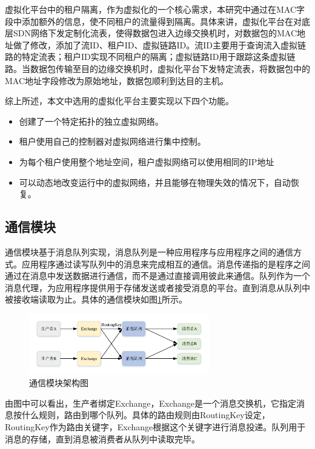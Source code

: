 虚拟化平台中的租户隔离，作为虚拟化的一个核心需求，本研究中通过在MAC字段中添加额外的信息，使不同租户的流量得到隔离。具体来讲，虚拟化平台在对底层SDN网络下发定制化流表，使得数据包进入边缘交换机时，对数据包的MAC地址做了修改，添加了流ID、租户ID、虚拟链路ID。流ID主要用于查询流入虚拟链路的特定流表；租户ID实现不同租户的隔离；虚拟链路ID用于跟踪这条虚拟链路。当数据包传输至目的边缘交换机时，虚拟化平台下发特定流表，将数据包中的MAC地址字段修改为原始地址，数据包顺利到达目的主机。

综上所述，本文中选用的虚拟化平台主要实现以下四个功能。
\begin{itemize}
\item 创建了一个特定拓扑的独立虚拟网络。
\item 租户使用自己的控制器对虚拟网络进行集中控制。
\item 为每个租户使用整个地址空间，租户虚拟网络可以使用相同的IP地址
\item 可以动态地改变运行中的虚拟网络，并且能够在物理失效的情况下，自动恢复。
\end{itemize}


\subsection{通信模块}
通信模块基于消息队列实现，消息队列是一种应用程序与应用程序之间的通信方式。应用程序通过读写队列中的消息来完成相互的通信。消息传递指的是程序之间通过在消息中发送数据进行通信，而不是通过直接调用彼此来通信。队列作为一个消息代理，为应用程序提供用于存储发送或者接受消息的平台。直到消息从队列中被接收端读取为止。具体的通信模块如图\ref{fig:rabbitmq}所示。

\begin{figure}[!htb]
  \centering
  \includegraphics[width=0.7\textwidth]{logo/rabbitmq}
  \caption{通信模块架构图}
  \label{fig:rabbitmq}
\end{figure}

由图中可以看出，生产者绑定Exchange，Exchange是一个消息交换机，它指定消息按什么规则，路由到哪个队列。具体的路由规则由RoutingKey设定，RoutingKey作为路由关键字，Exchange根据这个关键字进行消息投递。队列用于消息的存储，直到消息被消费者从队列中读取完毕\cite{rabbitmq}。

